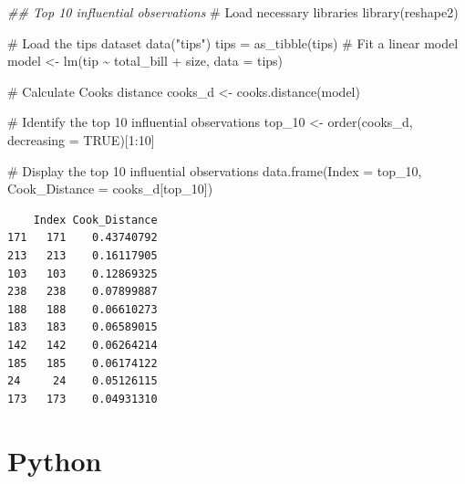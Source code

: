 \documentclass[
  letterpaper,
  DIV=11,
  numbers=noendperiod]{scrreprt}
\newenvironment{Shaded}{\begin{snugshade}}{\end{snugshade}}
\newcommand{\AttributeTok}[1]{\textcolor[rgb]{0.40,0.45,0.13}{#1}}
\newcommand{\CommentTok}[1]{\textcolor[rgb]{0.37,0.37,0.37}{#1}}
\newcommand{\ConstantTok}[1]{\textcolor[rgb]{0.56,0.35,0.01}{#1}}
\newcommand{\DecValTok}[1]{\textcolor[rgb]{0.68,0.00,0.00}{#1}}
\newcommand{\DocumentationTok}[1]{\textcolor[rgb]{0.37,0.37,0.37}{\textit{#1}}}
\newcommand{\FunctionTok}[1]{\textcolor[rgb]{0.28,0.35,0.67}{#1}}
\newcommand{\NormalTok}[1]{\textcolor[rgb]{0.00,0.23,0.31}{#1}}
\newcommand{\OtherTok}[1]{\textcolor[rgb]{0.00,0.23,0.31}{#1}}
\newcommand{\SpecialCharTok}[1]{\textcolor[rgb]{0.37,0.37,0.37}{#1}}
\newcommand{\StringTok}[1]{\textcolor[rgb]{0.13,0.47,0.30}{#1}}
\begin{document}
\begin{Shaded}
\begin{Highlighting}[]
\DocumentationTok{\#\# Top 10 influential observations }
\CommentTok{\# Load necessary libraries}
\FunctionTok{library}\NormalTok{(reshape2)}

\CommentTok{\# Load the \textquotesingle{}tips\textquotesingle{} dataset}
\FunctionTok{data}\NormalTok{(}\StringTok{"tips"}\NormalTok{)}
\NormalTok{tips }\OtherTok{=} \FunctionTok{as\_tibble}\NormalTok{(tips)}
\CommentTok{\# Fit a linear model}
\NormalTok{model }\OtherTok{\textless{}{-}} \FunctionTok{lm}\NormalTok{(tip }\SpecialCharTok{\textasciitilde{}}\NormalTok{ total\_bill }\SpecialCharTok{+}\NormalTok{ size, }\AttributeTok{data =}\NormalTok{ tips)}

\CommentTok{\# Calculate Cook\textquotesingle{}s distance}
\NormalTok{cooks\_d }\OtherTok{\textless{}{-}} \FunctionTok{cooks.distance}\NormalTok{(model)}

\CommentTok{\# Identify the top 10 influential observations}
\NormalTok{top\_10 }\OtherTok{\textless{}{-}} \FunctionTok{order}\NormalTok{(cooks\_d, }\AttributeTok{decreasing =} \ConstantTok{TRUE}\NormalTok{)[}\DecValTok{1}\SpecialCharTok{:}\DecValTok{10}\NormalTok{]}

\CommentTok{\# Display the top 10 influential observations}
\FunctionTok{data.frame}\NormalTok{(}\AttributeTok{Index =}\NormalTok{ top\_10, }\AttributeTok{Cook\_Distance =}\NormalTok{ cooks\_d[top\_10])}
\end{Highlighting}
\end{Shaded}

\begin{verbatim}
    Index Cook_Distance
171   171    0.43740792
213   213    0.16117905
103   103    0.12869325
238   238    0.07899887
188   188    0.06610273
183   183    0.06589015
142   142    0.06264214
185   185    0.06174122
24     24    0.05126115
173   173    0.04931310
\end{verbatim}

\section{Python}
\end{document}
